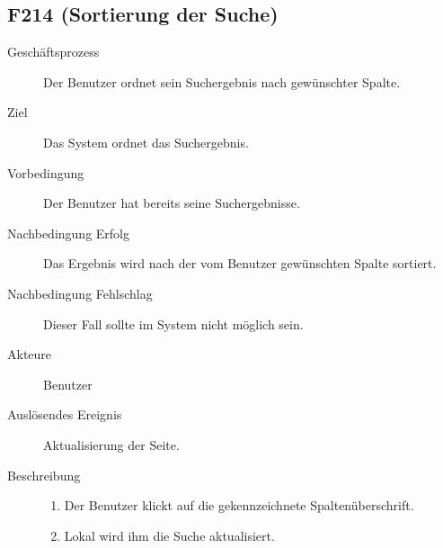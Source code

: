 \subsection{F214 (Sortierung der Suche)}
\begin{description}
  \item[Geschäftsprozess]Der Benutzer ordnet sein Suchergebnis nach gewünschter Spalte.
  \item[Ziel]Das System ordnet das Suchergebnis.
  \item[Vorbedingung]Der Benutzer hat bereits seine Suchergebnisse.
  \item[Nachbedingung Erfolg]Das Ergebnis wird nach der vom Benutzer gewünschten Spalte sortiert.
  \item[Nachbedingung Fehlschlag]Dieser Fall sollte im System nicht möglich sein.
  \item[Akteure]Benutzer
  \item[Auslösendes Ereignis]Aktualisierung der Seite.
  \item[Beschreibung]\hfill
    \begin{enumerate}
      \item Der Benutzer klickt auf die gekennzeichnete Spaltenüberschrift.
      \item Lokal wird ihm die Suche aktualisiert.
    \end{enumerate}
\end{description}

